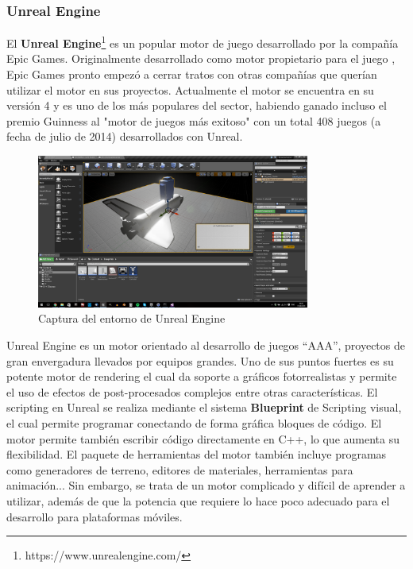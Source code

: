 \subsubsection{Unreal Engine}
El \textbf{Unreal Engine}\footnote{https://www.unrealengine.com/} es un popular motor de juego desarrollado por la compañía Epic Games. Originalmente desarrollado como motor propietario para el juego , Epic Games pronto empezó a cerrar tratos con otras compañías que querían utilizar el motor en sus proyectos. Actualmente el motor se encuentra en su versión 4 y es uno de los más populares del sector, habiendo ganado incluso el premio Guinness al "motor de juegos más exitoso" con un total 408 juegos (a fecha de julio de 2014) desarrollados con Unreal. 
\begin{figure}[h]
	\includegraphics[width=0.8\textwidth]{images/estadodelarte/motores/captura-unreal}
	\centering
	\caption{Captura del entorno de Unreal Engine}
\end{figure}

Unreal Engine es un motor orientado al desarrollo de juegos ``AAA'', proyectos de gran envergadura llevados por equipos grandes. Uno de sus puntos fuertes es su potente motor de rendering el cual da soporte a gráficos fotorrealistas y permite el uso de efectos de post-procesados complejos entre otras características. El scripting en Unreal se realiza mediante el sistema \textbf{Blueprint} de Scripting visual, el cual permite programar conectando de forma gráfica bloques de código. El motor permite también escribir código directamente en C++, lo que aumenta su flexibilidad. El paquete de herramientas del motor también incluye programas como generadores de terreno, editores de materiales, herramientas para animación... Sin embargo, se trata de un motor complicado y difícil de aprender a utilizar, además de que la potencia que requiere lo hace poco adecuado para el desarrollo para plataformas móviles.

